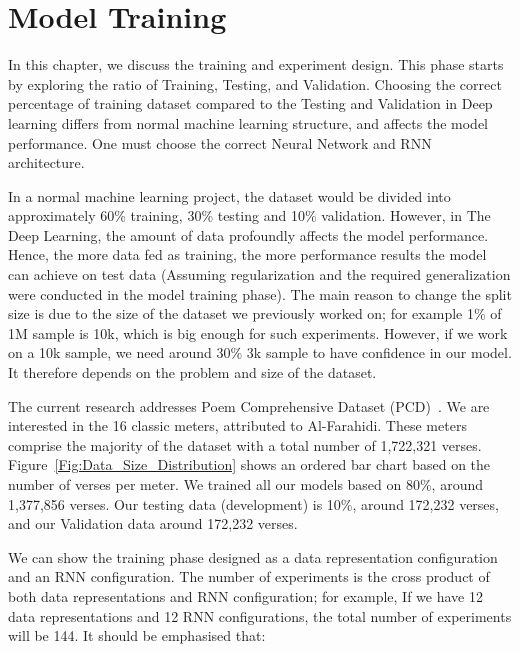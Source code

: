\chapter{Model Training}\label{Ch:Model_Training}


In this chapter, we discuss the training and experiment design. This phase starts by exploring the ratio of Training, Testing, and Validation. Choosing the correct percentage of training dataset compared to the Testing and Validation in Deep learning differs from normal machine learning structure, and affects the model performance. One must choose the correct Neural Network and RNN architecture.

\clearpage


In a normal machine learning project, the dataset would be divided into approximately 60\% training, 30\% testing and 10\% validation. However, in The Deep Learning, the amount of data profoundly affects the model performance. 
Hence, the more data fed as training, the more performance results the model can achieve on test data (Assuming regularization and the required generalization were conducted in the model training phase). 
The main reason to change the split size is due to the size of the dataset we previously worked on; for example 1\% of 1M sample is 10k, which is big enough for such experiments. 
However, if we work on a 10k sample, we need around 30\% 3k sample to have confidence in our model. It therefore depends on the problem and size of the dataset.

The current research addresses Poem Comprehensive Dataset (PCD)~\cite{ArabicpoetryDS}. We are interested in the 16 classic meters, attributed to Al-Farahidi. These meters comprise the majority of the dataset with a total number of 1,722,321 verses. Figure~\ref{Fig:Data_Size_Distribution} shows an ordered bar chart based on the number of verses per meter. We trained all our models based on 80\%, around 1,377,856 verses. Our testing data (development) is 10\%, around 172,232 verses, and our Validation data around 172,232 verses.

We can show the training phase designed as a data representation configuration and an RNN configuration. The number of experiments is the cross product of both data representations and RNN configuration; for example, If we have 12 data representations and 12 RNN configurations, the total number of experiments will be 144. It should be emphasised that:

